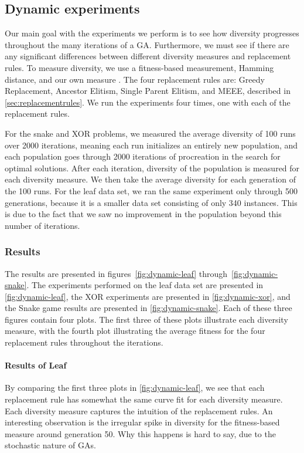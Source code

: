 \subsection{Dynamic experiments}\label{sec:continuousdiversity}
Our main goal with the experiments we perform is to see how diversity progresses throughout the many iterations of a GA. Furthermore, we must see if there are any significant differences between different diversity measures and replacement rules. To measure diversity, we use a fitness-based measurement, Hamming distance, and our own measure \dia. The four replacement rules are: Greedy Replacement, Ancestor Elitism, Single Parent Elitism, and MEEE, described in \cref{sec:replacementrules}. We run the experiments four times, one with each of the replacement rules.

For the snake and XOR problems, we measured the average diversity of \num{100} runs over \num{2000} iterations, meaning each run initializes an entirely new population, and each population goes through \num{2000} iterations of procreation in the search for optimal solutions. After each iteration, diversity of the population is measured for each diversity measure. We then take the average diversity for each generation of the \num{100} runs. For the leaf data set, we ran the same experiment only through \num{500} generations, because it is a smaller data set consisting of only \num{340} instances. This is due to the fact that we saw no improvement in the population beyond this number of iterations. 

\subsubsection{Results}
The results are presented in figures~\ref{fig:dynamic-leaf} through~\ref{fig:dynamic-snake}. The experiments performed on the leaf data set are presented in \cref{fig:dynamic-leaf}, the XOR experiments are presented in \cref{fig:dynamic-xor}, and the Snake game results are presented in \cref{fig:dynamic-snake}. Each of these three figures contain four plots. The first three of these plots illustrate each diversity measure, with the fourth plot illustrating the average fitness for the four replacement rules throughout the iterations. 

\paragraph{Results of Leaf} By comparing the first three plots in \cref{fig:dynamic-leaf}, we see that each replacement rule has somewhat the same curve fit for each diversity measure. Each diversity measure captures the intuition of the replacement rules. An interesting observation is the irregular spike in diversity for the fitness-based measure around generation \num{50}. Why this happens is hard to say, due to the stochastic nature of GAs.

